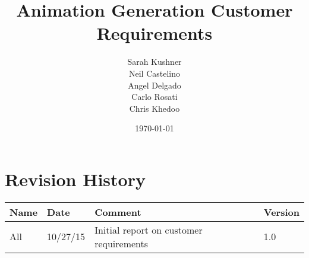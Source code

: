 \documentclass{article}
\begin{document}
\title{Animation Generation Customer Requirements}
\author{Sarah Kushner \\
		Neil Castelino \\
		Angel Delgado \\
		Carlo Rosati \\
		Chris Khedoo}
\date{\today}
\maketitle
\small

\pagebreak
\section{Revision History}
\begin{tabular}{|l|l|l|l|}
\hline
Name	& Date	 		& 	Comment	 								& 	Version	 \\ \hline
All		& 10/27/15		& 	Initial report on customer requirements	&  	1.0 	 \\ \hline
\end{tabular}

\pagebreak




\end{document}
